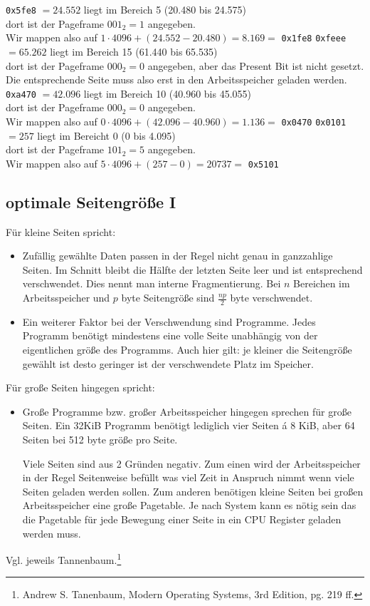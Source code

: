 \documentclass[ngerman]{fbi-aufgabenblatt}
\begin{document}
 \texttt{0x5fe8} $=24.552$ liegt im Bereich 5 (20.480 bis 24.575) \\
dort ist der Pageframe $001_2 = 1$ angegeben. \\
Wir mappen also auf $1 \cdot 4096 + (24.552 - 20.480) = 8.169 =$ \texttt{0x1fe8}
 \texttt{0xfeee} $= 65.262$ liegt im Bereich 15 (61.440 bis 65.535)\\
dort ist der Pageframe $000_2 = 0$ angegeben, aber das Present Bit ist nicht gesetzt.\\
Die entsprechende Seite muss also erst in den Arbeitsspeicher geladen werden.
 \texttt{0xa470} $=42.096$ liegt im Bereich 10 (40.960 bis 45.055) \\
dort ist der Pageframe $000_2 = 0$ angegeben. \\
Wir mappen also auf $0 \cdot 4096 + (42.096 - 40.960) = 1.136 =$ \texttt{0x0470}
 \texttt{0x0101} $=257$ liegt im Bereicht 0 (0 bis 4.095) \\
dort ist der Pageframe $101_2 = 5$ angegeben. \\
Wir mappen also auf $5 \cdot 4096 + (257 - 0) = 20737 = $ \texttt{0x5101}


\subsection{optimale Seitengröße I}

Für kleine Seiten spricht:
\begin{itemize}
 \item Zufällig gewählte Daten passen in der Regel nicht genau in ganzzahlige Seiten.
 Im Schnitt bleibt die Hälfte der letzten Seite leer und ist entsprechend verschwendet.
 Dies nennt man interne Fragmentierung. Bei $n$ Bereichen im Arbeitsspeicher und $p$ byte 
 Seitengröße sind $\frac{np}{2}$ byte verschwendet.
 \item Ein weiterer Faktor bei der Verschwendung sind Programme. Jedes Programm benötigt mindestens
 eine volle Seite unabhängig von der eigentlichen größe des Programms. Auch hier gilt: je kleiner
 die Seitengröße gewählt ist desto geringer ist der verschwendete Platz im Speicher.
\end{itemize}
Für große Seiten hingegen spricht:
\begin{itemize}
 \item Große Programme bzw. großer Arbeitsspeicher hingegen sprechen für große Seiten.
 Ein 32KiB Programm benötigt lediglich vier Seiten á 8 KiB, aber 64 Seiten bei 512 byte größe pro Seite. 
 
 Viele Seiten sind aus 2 Gründen negativ. Zum einen wird der Arbeitsspeicher in der Regel Seitenweise
 befüllt was viel Zeit in Anspruch nimmt wenn viele Seiten geladen werden sollen.
 Zum anderen benötigen kleine Seiten bei großen Arbeitsspeicher eine große Pagetable. Je nach System
 kann es nötig sein das die Pagetable für jede Bewegung einer Seite in ein CPU Register geladen werden
 muss.

\end{itemize}
Vgl. jeweils Tannenbaum.\footnote[3]{Andrew S. Tanenbaum, Modern Operating Systems, 3rd Edition, pg. 219 ff.}
\end{document}
